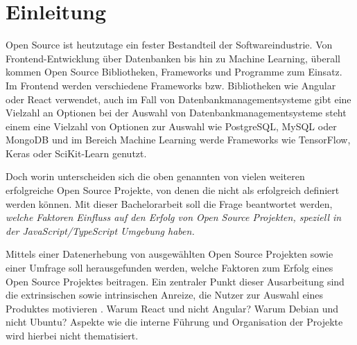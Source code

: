 \chapter{Einleitung}






Open Source ist heutzutage ein fester Bestandteil der Softwareindustrie.
Von Frontend-Entwicklung über Datenbanken bis hin zu Machine Learning, überall kommen Open Source
Bibliotheken, Frameworks und Programme zum Einsatz.
Im Frontend werden verschiedene Frameworks bzw. Bibliotheken wie Angular oder React verwendet,
auch im Fall von Datenbankmanagementsysteme gibt eine Vielzahl an Optionen
bei der Auswahl von Datenbankmanagementsysteme steht einem eine Vielzahl von Optionen zur Auswahl
wie PostgreSQL, MySQL oder MongoDB
und im Bereich Machine Learning werde Frameworks wie TensorFlow, Keras oder SciKit-Learn genutzt.

Doch worin unterscheiden sich die oben genannten von vielen weiteren erfolgreiche Open Source
Projekte, von denen die nicht als erfolgreich definiert werden können.
Mit dieser Bachelorarbeit soll die Frage beantwortet werden, \textit{welche Faktoren Einfluss auf
    den Erfolg von Open Source Projekten, speziell in der JavaScript/TypeScript Umgebung haben.}


Mittels einer Datenerhebung von ausgewählten Open Source Projekten sowie einer
Umfrage soll herausgefunden werden, welche Faktoren zum Erfolg eines Open Source Projektes beitragen.
Ein zentraler Punkt dieser Ausarbeitung sind die extrinsischen sowie intrinsischen Anreize, %
die Nutzer zur Auswahl eines Produktes motivieren \cite{midhaFactorsAffectingSuccess2012}. %
Warum React und nicht Angular? Warum Debian und nicht Ubuntu?
Aspekte wie die interne Führung und Organisation der Projekte wird hierbei nicht thematisiert.




